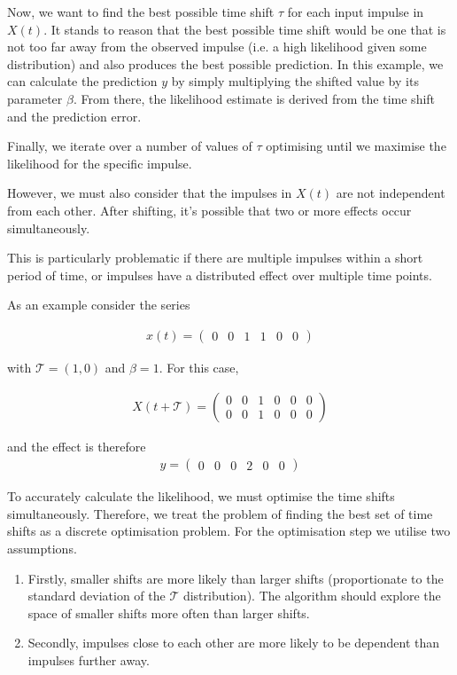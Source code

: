 \documentclass[11pt]{amsart}
\begin{document}
Now, we want to find the best possible time shift $\tau$ for each input impulse in $X(t)$. It stands to reason that the best possible time shift would be one that is not too far away from the observed impulse (i.e. a high likelihood given some distribution) and also produces the best possible prediction. In this example, we can calculate the prediction $y$ by simply multiplying the shifted value by its parameter $\beta$. From there, the likelihood estimate is derived from the time shift and the prediction error.

Finally, we iterate over a number of values of $\tau$ optimising until we maximise the likelihood for the specific impulse.

However, we must also consider that the impulses in $X(t)$ are not independent from each other. After shifting, it's possible that two or more effects occur simultaneously.

This is particularly problematic if there are multiple impulses within a short period of time, or impulses have a distributed effect over multiple time points. 

As an example consider the series 

\begin{align}
x(t) = 
\left(
\begin{array}{cccccc}
0 & 0 & 1 & 1 & 0 & 0
\end{array}  
\right)
\end{align}

with $\mathcal{T}= (1, 0)$ and $\beta = 1$. For this case, 

\begin{align}
X(t + \mathcal{T}) = 
\left(
\begin{array}{cccccc}
0 & 0 & 1 & 0 & 0 & 0 \\
0 & 0 & 1 & 0 & 0 & 0 
\end{array}  
\right)
\end{align}

and the effect is therefore 
\begin{align}
y = 
\left(
\begin{array}{cccccc}
0 & 0 & 0 & 2 & 0 & 0
\end{array}  
\right)
\end{align}

To accurately calculate the likelihood, we must optimise the time shifts simultaneously. Therefore, we treat the problem of finding the best set of time shifts as a discrete optimisation problem. For the optimisation step we utilise two assumptions.
\begin{enumerate}
\item Firstly, smaller shifts are more likely than larger shifts (proportionate to the standard deviation of the $\mathcal{T}$ distribution). The algorithm should explore the space of smaller shifts more often than larger shifts. 
\item Secondly, impulses close to each other are more likely to be dependent than impulses further away. 
\end{enumerate}
\end{document}
